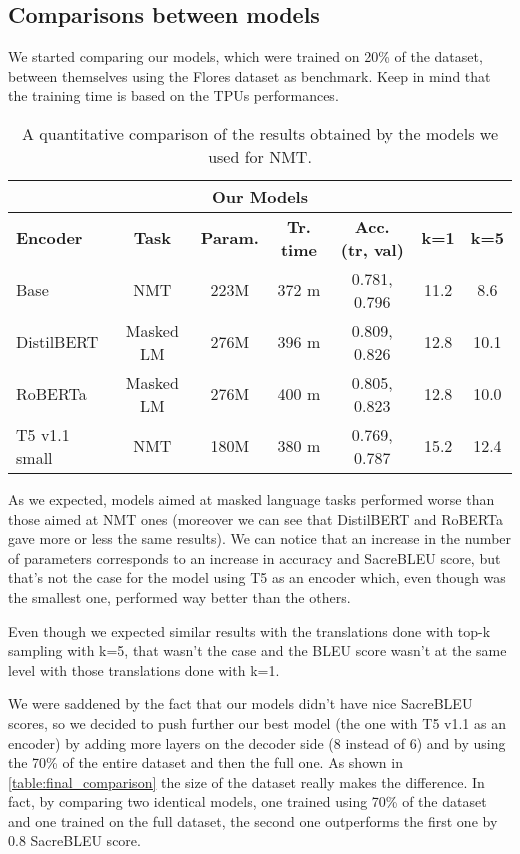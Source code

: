 \subsection{Comparisons between models}
We started comparing our models, which were trained on 20\% of the dataset, between themselves using the Flores dataset as benchmark. Keep in mind that the training time is based on the TPUs performances.
\begin{table}[H]
\centering
\begin{tabular}{l|c|c|c|c|c|c}\hline \hline
\multicolumn{7}{c}{\textbf{Our Models}} \\\hline
\textbf{Encoder} & \textbf{Task} & \textbf{Param.} & \textbf{Tr. time} & \textbf{Acc. (tr, val)} & \textbf{k=1} & \textbf{k=5}\\\hline
Base & NMT & 223M & 372 m & 0.781, 0.796 & 11.2 & 8.6\\
DistilBERT & Masked LM & 276M & 396 m & 0.809, 0.826 & 12.8 & 10.1\\
RoBERTa & Masked LM & 276M & 400 m & 0.805, 0.823 & 12.8 & 10.0\\
T5 v1.1 small & NMT & 180M & 380 m & 0.769, 0.787 & 15.2 & 12.4\\\hline \hline
\end{tabular}
\caption{A quantitative comparison of the results obtained by the models we used for NMT.}
\end{table}
As we expected, models aimed at masked language tasks performed worse than those aimed at NMT ones (moreover we can see that DistilBERT and RoBERTa gave more or less the same results). We can notice that an increase in the number of parameters corresponds to an increase in accuracy and SacreBLEU score, but that's not the case for the model using T5 as an encoder which, even though was the smallest one, performed way better than the others.
\vspace{3mm}

Even though we expected similar results with the translations done with top-k sampling with k=5, that wasn't the case and the BLEU score wasn't at the same level with those translations done with k=1.
\vspace{3mm}

We were saddened by the fact that our models didn't have nice SacreBLEU scores, so we decided to push further our best model (the one with T5 v1.1 as an encoder) by adding more layers on the decoder side (8 instead of 6) and by using the 70\% of the entire dataset and then the full one. As shown in \autoref{table:final_comparison} the size of the dataset really makes the difference. In fact, by comparing two identical models, one trained using 70\% of the dataset and one trained on the full dataset, the second one outperforms the first one by 0.8 SacreBLEU score.

